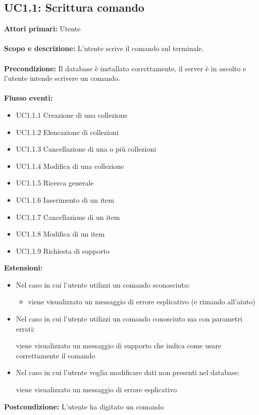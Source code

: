 \documentclass{scalatekids-article}
\begin{document}
\subsection{UC1.1: Scrittura comando}
\textbf{Attori primari:} Utente\\ \\
\textbf{Scopo e descrizione:} L’utente scrive il comando sul terminale.\\ \\
\textbf{Precondizione:} Il database è installato correttamente, il server è in ascolto e l'utente intende scrivere un comando.\\ \\
\textbf{Flusso eventi:}
\begin{itemize}
\item UC1.1.1 Creazione di una collezione
\item UC1.1.2 Elencazione di collezioni
\item UC1.1.3 Cancellazione di una o più collezioni
\item UC1.1.4 Modifica di una collezione
\item UC1.1.5 Ricerca generale
\item UC1.1.6 Inserimento di un item
\item UC1.1.7 Cancellazione di un item
\item UC1.1.8 Modifica di un item
\item UC1.1.9 Richiesta di supporto
\end{itemize}
\textbf{Estensioni:}
\begin{itemize}
\item Nel caso in cui l'utente utilizzi un comando sconosciuto:
  \begin{itemize}
  \item viene visualizzato un messaggio di errore esplicativo (e rimando all'aiuto)
  \end{itemize}
\item Nel caso in cui l'utente utilizzi un comando conosciuto ma con parametri errati:
  \begin{itemize}
    viene visualizzato un messaggio di supporto che indica come usare correttamente il comando
  \end{itemize}
\item Nel caso in cui l'utente voglia modificare dati non presenti nel database:
  \begin{itemize}
    viene visualizzato un messaggio di errore esplicativo
  \end{itemize}
\end{itemize}
\textbf{Postcondizione:} L'utente ha digitato un comando
\end{document}
